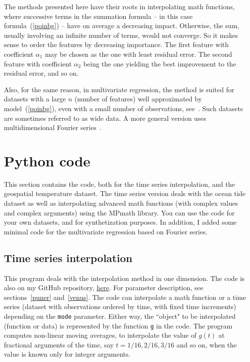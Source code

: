 \documentclass[oneside,10pt]{book}
\begin{document}
The methods presented here have their roots in interpolating math functions, where successive terms in the summation formula -- in this case formula~(\ref{poinbg}) -- have on average a decreasing impact. Otherwise, the sum, usually involving an infinite number of terms, would not converge. So it makes sense to order the features by decreasing importance. The first feature with coefficient $\alpha_1$ may be chosen as the one with least residual error. The second feature with coefficient $\alpha_2$ being the one yielding the best improvement to the residual error, and so on.  

Also, for the same reason, in multivariate regression, the method is suited for datasets with a large $n$ (number of features)  well approximated by model~(\ref{poinbg}), even with a small number of observations, see~\cite{four2}. 
 Such datasets are sometimes referred to as \textcolor{index}{wide data}. A more general version uses \textcolor{index}{multidimensional Fourier series}~\cite{mfour10}.



\section{Python code}

This section contains the code, both for the time series interpolation, and the geospatial temperature dataset. The time series version
  deals with the ocean tide dataset as well as interpolating advanced math functions (with complex values and complex arguments) using the MPmath library. You can use the code for your own datasets, and for synthetization purposes. In addition, I added some minimal code for the multivariate regression based on Fourier series.

\subsection{Time series interpolation}\label{porewa}

This program deals with the interpolation method in one dimension. The code is also on my 
GitHub repository, \href{https://github.com/VincentGranville/Statistical-Optimization/blob/main/interpol_fourier.py}{here}. For parameter description, see 
 sections~\ref{puner} and~\ref{venus}.  The code can interpolate a math function or a time series (dataset with observations ordered by time, with fixed time increments) depending on 
 the \texttt{mode} parameter. Either way, the ``object" to be interpolated (function or data) is represented by the function \texttt{g} in the code. The program computes  
 non-linear moving averages,  to interpolate the value of $g(t)$ at fractional arguments of the time, say $t = 1/16, 2/16, 3/16$ and so on, when the value is known  only for integer arguments. 
\end{document}

